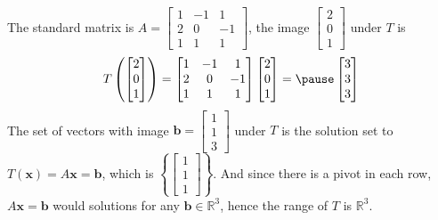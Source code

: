 \documentclass{beamer}
\theoremstyle{definition}
\theoremstyle{remark}
\begin{document}
\begin{frame}[t]
\begin{solution}
The standard matrix is $A=\begin{bmatrix}
1&-1&1\\
2&0&-1\\
1&1&1
\end{bmatrix}$\pause, the image $\begin{bmatrix}
2\\0\\1
\end{bmatrix}$ under $T$ is
\[
T\left(\begin{bmatrix}
2\\0\\1
\end{bmatrix}\right)=\begin{bmatrix}
1&-1&1\\
2&0&-1\\
1&1&1
\end{bmatrix}\begin{bmatrix}
2\\0\\1
\end{bmatrix}=\pause\begin{bmatrix}
3\\3\\3
\end{bmatrix}
\]
The set of vectors with image $\mathbf b=\begin{bmatrix}
1\\1\\3
\end{bmatrix}$ under $T$ is the solution set to $T(\mathbf x)=A\mathbf x=\mathbf b$\pause, which is $\left\{\begin{bmatrix}
1\\1\\1
\end{bmatrix}\right\}$\pause. And since there is a pivot in each row, $A\mathbf x=\mathbf b$ would solutions for any $\mathbf b\in\mathbb R^3$, hence the range of $T$ is $\mathbb R^3$.
\end{solution}
\end{frame}
\end{document}
